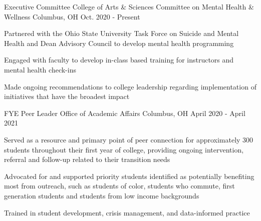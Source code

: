 

\begin{cventries}

  \cventry
    {Executive Committee} %
    {College of Arts \& Sciences Committee on Mental Health \& Wellness} %
    {Columbus, OH} %
    {Oct. 2020 - Present} %
    {
      \begin{cvitems} %
        \item {Partnered with the Ohio State University Task Force on Suicide and Mental Health and Dean Advisory Council to develop mental health programming}
        \item {Engaged with faculty to develop in-class based training for instructors and mental health check-ins}
        \item {Made ongoing recommendations to college leadership regarding implementation of initiatives that have the broadest impact}
      \end{cvitems}
    }

  \cventry
    {FYE Peer Leader} %
    {Office of Academic Affairs} %
    {Columbus, OH} %
    {April 2020 - April 2021} %
    {
      \begin{cvitems} %
        \item {Served as a resource and primary point of peer connection for approximately 300 students throughout their first year of college, providing ongoing intervention, referral and follow-up related to their transition needs}
        \item {Advocated for and supported priority students identified as potentially benefiting most from outreach, such as students of color, students who commute, first generation students and students from low income backgrounds}
        \item{Trained in student development, crisis management, and data-informed practice}
      \end{cvitems}
    }


\end{cventries}
